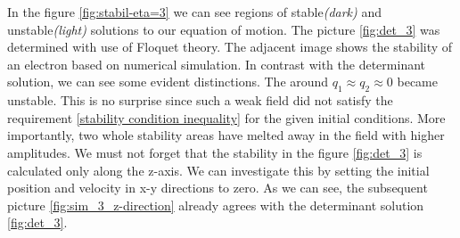 In the figure \ref{fig:stabil-eta=3} we can see regions of stable\textit{(dark)} and unstable\textit{(light)} solutions to our equation of motion. The picture \ref{fig:det_3} was determined with use of Floquet theory. The adjacent image shows the stability of an electron based on numerical simulation. In contrast with the determinant solution, we can see some evident distinctions. The around $q_1 \approx q_2 \approx 0$ became unstable. This is no surprise since such a weak field did not satisfy the requirement \eqref{stability condition inequality} for the given initial conditions. More importantly, two whole stability areas have melted away in the field with higher amplitudes. We must not forget that the stability in the figure \ref{fig:det_3} is calculated only along the z-axis. We can investigate this by setting the initial position and velocity in x-y directions to zero. As we can see, the subsequent picture \ref{fig:sim_3_z-direction} already agrees with the determinant solution \ref{fig:det_3}.

